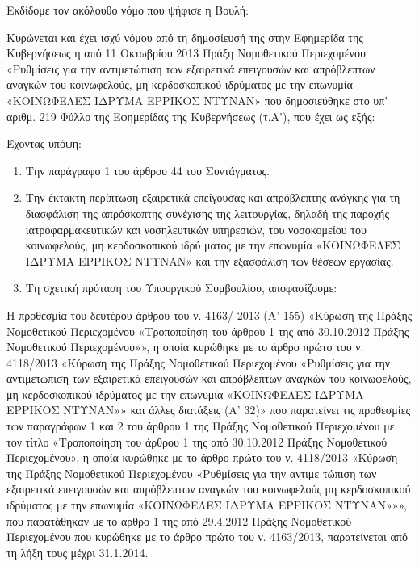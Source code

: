 \documentclass[twoside, a4paper, 10pt]{article}
\begin{document}

\begin{multicols}{2}

\TOCprint


Εκδίδομε τον ακόλουθο νόμο που ψήφισε η Βουλή:

Κυρώνεται και έχει ισχύ νόμου από τη δημοσίευσή της στην Εφημερίδα της Κυβερνήσεως η από 11 Οκτωβρίου 2013 Πράξη Νομοθετικού Περιεχομένου «Ρυθμίσεις για την αντιμετώπιση των εξαιρετικά επειγουσών και απρόβλεπτων αναγκών του κοινωφελούς, μη κερδοσκοπικού ιδρύματος με την επωνυμία «ΚΟΙΝΩΦΕΛΕΣ ΙΔΡΥΜΑ ΕΡΡΙΚΟΣ ΝΤΥΝΑΝ» που δημοσιεύθηκε στο υπ’ αριθμ. 219 Φύλλο της Εφημερίδας της Κυβερνήσεως (τ.Α'), που έχει ως εξής:

\begin{BigQuote}
Έχοντας υπόψη:
\begin{enumerate}
  \item[1.] Την παράγραφο 1 του άρθρου 44 του Συντάγματος.
  \item[2.] Την έκτακτη περίπτωση εξαιρετικά επείγουσας και απρόβλεπτης ανάγκης για τη διασφάλιση της απρόσκοπτης συνέχισης της λειτουργίας, δηλαδή της παροχής ιατροφαρμακευτικών και νοσηλευτικών υπηρεσιών, του νοσοκομείου του κοινωφελούς, μη κερδοσκοπικού ιδρύ ματος με την επωνυμία «ΚΟΙΝΩΦΕΛΕΣ ΙΔΡΥΜΑ ΕΡΡΙΚΟΣ ΝΤΥΝΑΝ» και την εξασφάλιση των θέσεων εργασίας.
  \item[3.] Τη σχετική πρόταση του Υπουργικού Συμβουλίου, αποφασίζουμε:
\end{enumerate}

Η προθεσμία του δευτέρου άρθρου του ν. 4163/ 2013 (Α' 155) «Κύρωση της Πράξης Νομοθετικού Περιεχομένου «Τροποποίηση του άρθρου 1 της από 30.10.2012 Πράξης Νομοθετικού Περιεχομένου»», η οποία κυρώθηκε με το άρθρο πρώτο του ν. 4118/2013 «Κύρωση της Πράξης Νομοθετικού Περιεχομένου «Ρυθμίσεις για την αντιμετώπιση των εξαιρετικά επειγουσών και απρόβλεπτων αναγκών του κοινωφελούς, μη κερδοσκοπικού ιδρύματος με την επωνυμία «ΚΟΙΝΩΦΕΛΕΣ ΙΔΡΥΜΑ ΕΡΡΙΚΟΣ ΝΤΥΝΑΝ»» και άλλες διατάξεις (Α' 32)» που παρατείνει τις προθεσμίες των παραγράφων 1 και 2 του άρθρου 1 της Πράξης Νομοθετικού Περιεχομένου με τον τίτλο «Τροποποίηση του άρθρου 1 της από 30.10.2012 Πράξης Νομοθετικού Περιεχομένου», η οποία κυρώθηκε με το άρθρο πρώτο του ν. 4118/2013 «Κύρωση της Πράξης Νομοθετικού Περιεχομένου «Ρυθμίσεις για την αντιμε τώπιση των εξαιρετικά επειγουσών και απρόβλεπτων αναγκών του κοινωφελούς μη κερδοσκοπικού ιδρύματος με την επωνυμία «ΚΟΙΝΩΦΕΛΕΣ ΙΔΡΥΜΑ ΕΡΡΙΚΟΣ ΝΤΥΝΑΝ»»», που παρατάθηκαν με το άρθρο 1 της από 29.4.2012 Πράξης Νομοθετικού Περιεχομένου που κυρώθηκε με το άρθρο πρώτο του ν. 4163/2013, παρατείνεται από τη λήξη τους μέχρι 31.1.2014.


\end{BigQuote}
\end{multicols}
\end{document}
